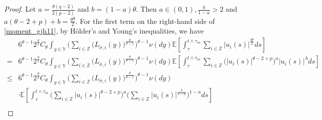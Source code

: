 \documentclass[11pt]{article}
\numberwithin{equation}{section}
\theoremstyle{plain}
\begin{document}
\begin{proof}
 Let 
 $ a = \tfrac{\theta(q-2)}{2(p-2)}$ and $
     b = (1-a) \theta.
 $
Then $a \in (0,1), \tfrac{b}{1-a} > 2$ 
 and $a (\theta-2+p) + b = \tfrac{q \theta}{2}$.
 For the first term on the right-hand side of \eqref{moment_gjh11},
 by H\"older's and Young's inequalities, we have
 \begin{align}\label{I11}
 	   & 6^{\theta-1} 2^{\frac{\theta}{2}} C_{\theta}  
 	             \int_{y\in\mathbb{Y}
 	             } 
                     \Big( \sum_{i \in \mathbb{Z}}
 	                                  \big( L_{\tilde{\sigma},i}(y) \big)^{\frac{\theta}{\theta-1}}
 	                 \Big)^{\theta-1} \nu(dy) 
 	                 \mathbb{E} 
 	                         \left[ \int_{\tau}^{t \wedge \tau_m}
 	                                      \sum_{i \in \mathbb{Z}}
 	                                      |u_i(s)|^{\frac{q \theta}{2}} ds 
                    	     \right]  \nonumber \\
   = & 6^{\theta-1} 2^{\frac{\theta}{2}} C_{\theta}  
                	\int_{y \in \mathbb{Y} } 
                      	\Big( \sum_{i \in \mathbb{Z}}
 	                                     \big( L_{\tilde{\sigma},i}(y) 
 	                                     \big)^{\frac{\theta}{\theta-1}}
                    	\Big)^{\theta-1} \nu(dy) 
                        \mathbb{E} 
 	                            \left[ \int_{\tau}^{t \wedge \tau_m}
 	                                         \sum_{i \in \mathbb{Z}}
 	                                               \big(|u_i(s)|^{\theta-2+p}\big)^{a}
                                                	|u_i(s)|^{\,b} ds 
                            	\right]  \nonumber\\
  \le & 6^{\theta-1} 2^{\frac{\theta}{2}} C_{\theta}  
 	                    \int_{y \in \mathbb{Y} } 
 	                        \Big( \sum_{i \in \mathbb{Z}}
 	                                         \big( L_{\tilde{\sigma},i}(y) 
 	                                         \big)^{\frac{\theta}{\theta-1}}
 	                        \Big)^{\theta-1} \nu(dy)  \nonumber \\
 	   & \cdot \mathbb{E} 
 	                      \left[ \int_{\tau}^{t \wedge \tau_m}
 	                                   \Big( \sum_{i \in \mathbb{Z}} |u_i(s)|^{\theta-2+p} 
 	                                   \Big)^{a}
 	                                   \Big( \sum_{i \in \mathbb{Z}} 
 	                                                     |u_i(s)|^{\frac{b}{1-a}}
 	                                   \Big)^{1-a} ds 
 	                       \right]  \nonumber\\

\end{align}
\end{proof}
\end{document}
